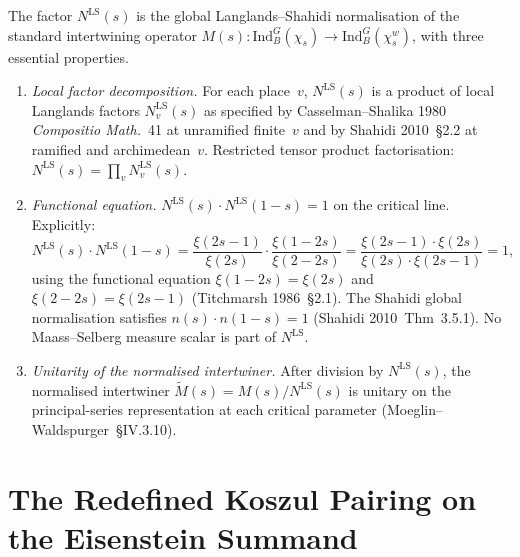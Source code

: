 \begin{remark}
\label{v4-arith:w6-c:rem:LS-origin}
The factor \(N^{\mathrm{LS}}(s)\) is the global Langlands--Shahidi
normalisation of the standard intertwining operator
\(M(s)\colon\mathrm{Ind}_{B}^{G}(\chi_{s})\to\mathrm{Ind}_{B}^{G}(\chi_{s}^{w})\),
with three essential properties.
\begin{enumerate}
\item[(LS1)] \emph{Local factor decomposition.} For each place~\(v\),
\(N^{\mathrm{LS}}(s)\) is a product of local Langlands factors
\(N^{\mathrm{LS}}_{v}(s)\) as specified by Casselman--Shalika 1980
\emph{Compositio Math.}~41 at unramified finite~\(v\) and by Shahidi
2010~\S2.2 at ramified and archimedean~\(v\). Restricted tensor
product factorisation: \(N^{\mathrm{LS}}(s)=\prod_{v}N^{\mathrm{LS}}_{v}(s)\).
\item[(LS2)] \emph{Functional equation.}
\(N^{\mathrm{LS}}(s)\cdot N^{\mathrm{LS}}(1-s)=1\)
on the critical line. Explicitly:
\[
N^{\mathrm{LS}}(s)\cdot N^{\mathrm{LS}}(1-s)
=\frac{\xi(2s-1)}{\xi(2s)}\cdot\frac{\xi(1-2s)}{\xi(2-2s)}
=\frac{\xi(2s-1)\cdot\xi(2s)}{\xi(2s)\cdot\xi(2s-1)}=1,
\]
using the functional equation \(\xi(1-2s)=\xi(2s)\) and
\(\xi(2-2s)=\xi(2s-1)\) (Titchmarsh 1986~\S2.1). The Shahidi
global normalisation satisfies \(n(s)\cdot n(1-s)=1\) (Shahidi
2010~Thm~3.5.1). No Maass--Selberg measure scalar is part of
\(N^{\mathrm{LS}}\).
\item[(LS3)] \emph{Unitarity of the normalised intertwiner.} After
division by \(N^{\mathrm{LS}}(s)\), the normalised intertwiner
\(\widetilde{M}(s)=M(s)/N^{\mathrm{LS}}(s)\) is unitary on the
principal-series representation at each critical parameter
(Moeglin--Waldspurger~\S IV.3.10).
\end{enumerate}
\end{remark}

\section{The Redefined Koszul Pairing on the Eisenstein Summand}
\label{v4-arith:w6-c:LS:redefinition}

